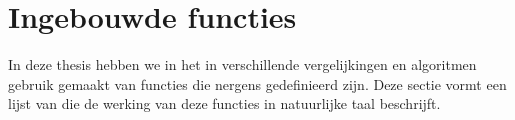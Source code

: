 \section{Ingebouwde functies}

In deze thesis hebben we in het in verschillende vergelijkingen en algoritmen gebruik gemaakt van functies die nergens gedefinieerd zijn. Deze sectie vormt een lijst van die de werking van deze functies in natuurlijke taal beschrijft.